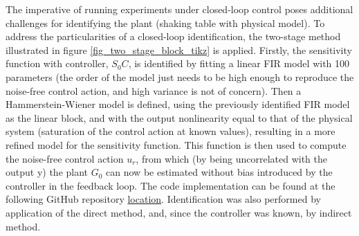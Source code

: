 \documentclass[  10pt, twoside]{report} %
\numberwithin{equation}{chapter}
\begin{document}
The imperative of running experiments under closed-loop control poses additional challenges for identifying the plant (shaking table with physical model). To address the particularities of a closed-loop identification, the two-stage method \citep{vandenhof1993} illustrated in figure \ref{fig_two_stage_block_tikz} is applied. Firstly, the sensitivity function with controller, $S_0 C$, is identified by fitting a linear FIR model with 100 parameters (the order of the model just needs to be high enough to reproduce the noise-free control action, and high variance is not of concern). Then a Hammerstein-Wiener model is defined, using the previously identified FIR model as the linear block, and with the output nonlinearity equal to that of the physical system (saturation of the control action at known values), resulting in a more refined model for the sensitivity function. This function is then used to compute the noise-free control action $u_r$, from which (by being uncorrelated with the output y) the plant $G_0$ can now be estimated without bias introduced by the controller in the feedback loop.  The code implementation can be found at the following GitHub repository \href{https://github.com/c-radicallis/minimesa_data/blob/main/}{location}.  Identification was also performed by application of the direct method, and, since the controller was known, by indirect method. 
\end{document}
